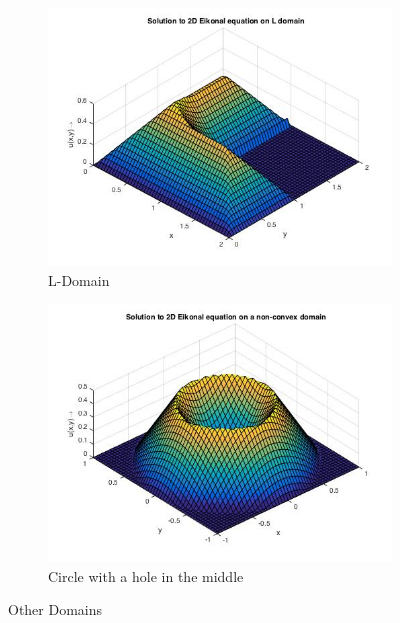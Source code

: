 						\begin{figure}[h!]
							\begin{subfigure}{.5\textwidth}
								\centering
								\includegraphics[scale = 0.45]{Images/2D_eik_Ldomain.jpg}
								\caption{L-Domain}
								\label{fig:12}
								\end{subfigure}
								\begin{subfigure}{.5\textwidth}
									\centering
									\includegraphics[scale = 0.45]{Images/2D_eik_hole.jpg}
									\caption{Circle with a hole in the middle}
									\label{fig:13}
									\end{subfigure}
									\caption{Other Domains}
									\end{figure}
									
